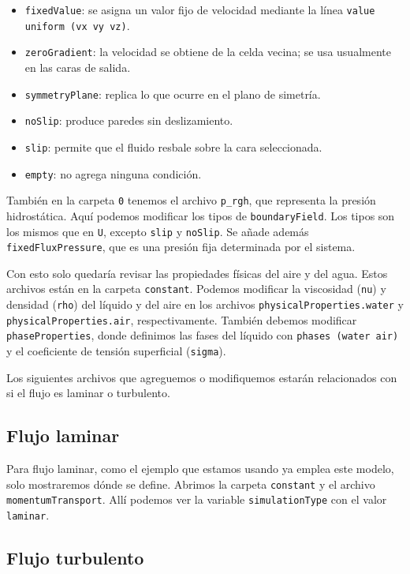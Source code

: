 \documentclass[12pt]{article}
\begin{document}
\begin{itemize}
  \item \texttt{fixedValue}: se asigna un valor fijo de velocidad mediante la línea \texttt{value uniform (vx vy vz)}.
  \item \texttt{zeroGradient}: la velocidad se obtiene de la celda vecina; se usa usualmente en las caras de salida.
  \item \texttt{symmetryPlane}: replica lo que ocurre en el plano de simetría.
  \item \texttt{noSlip}: produce paredes sin deslizamiento.
  \item \texttt{slip}: permite que el fluido resbale sobre la cara seleccionada.
  \item \texttt{empty}: no agrega ninguna condición.
\end{itemize}

También en la carpeta \texttt{0} tenemos el archivo \texttt{p\_rgh}, que representa la presión hidrostática. Aquí podemos modificar los tipos de \texttt{boundaryField}. Los tipos son los mismos que en \texttt{U}, excepto \texttt{slip} y \texttt{noSlip}. Se añade además \texttt{fixedFluxPressure}, que es una presión fija determinada por el sistema.

Con esto solo quedaría revisar las propiedades físicas del aire y del agua. Estos archivos están en la carpeta \texttt{constant}. Podemos modificar la viscosidad (\texttt{nu}) y densidad (\texttt{rho}) del líquido y del aire en los archivos \texttt{physicalProperties.water} y \texttt{physicalProperties.air}, respectivamente. También debemos modificar \texttt{phaseProperties}, donde definimos las fases del líquido con \texttt{phases (water air)} y el coeficiente de tensión superficial (\texttt{sigma}).

Los siguientes archivos que agreguemos o modifiquemos estarán relacionados con si el flujo es laminar o turbulento.

\subsection{Flujo laminar}

Para flujo laminar, como el ejemplo que estamos usando ya emplea este modelo, solo mostraremos dónde se define. Abrimos la carpeta \texttt{constant} y el archivo \texttt{momentumTransport}. Allí podemos ver la variable \texttt{simulationType} con el valor \texttt{laminar}.

\subsection{Flujo turbulento}
\end{document}
